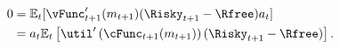   \begin{equation}\begin{gathered}\begin{aligned}
    0  & = \Ex_{t}[{\vFunc}_{t+1}^{\prime}({m}_{t+1})(\Risky_{t+1}-\Rfree){a}_{t}] \notag
    \\         & = {a}_{t}\Ex_{t}\left[\util^{\prime}\left(\cFunc_{t+1}({m}_{t+1})\right)(\Risky_{t+1}-\Rfree)\right] \label{eq:FOCw}.
  \end{aligned}\end{gathered}\end{equation}
